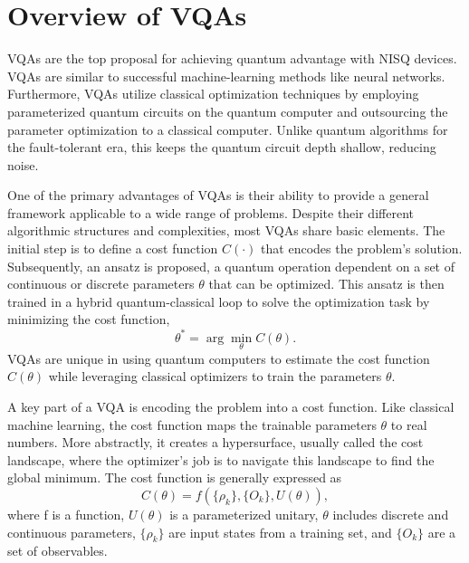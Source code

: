 \documentclass[12pt,dvipdfmx,twoside,openright]{report}
\begin{document}
\section{Overview of VQAs}
VQAs are the top proposal for achieving quantum advantage with NISQ devices. 
VQAs are similar to successful machine-learning methods like neural networks.
Furthermore, VQAs utilize classical optimization techniques by employing parameterized quantum circuits on the quantum computer and outsourcing the parameter optimization to a classical computer.
Unlike quantum algorithms for the fault-tolerant era, this keeps the quantum circuit depth shallow, reducing noise.

One of the primary advantages of VQAs is their ability to provide a general framework applicable to a wide range of problems.
Despite their different algorithmic structures and complexities, most VQAs share basic elements.
The initial step is to define a cost function $C(\cdot )$ that encodes the problem's solution. 
Subsequently, an ansatz is proposed, a quantum operation dependent on a set of continuous or discrete parameters $\theta$ that can be optimized. 
This ansatz is then trained in a hybrid quantum-classical loop to solve the optimization task by minimizing the cost function,
\begin{equation}
    \theta^* = \arg \min_\theta C(\theta).
\end{equation}
VQAs are unique in using quantum computers to estimate the cost function $C(\theta)$ while leveraging classical optimizers to train the parameters $\theta$.

A key part of a VQA is encoding the problem into a cost function. 
Like classical machine learning, the cost function maps the trainable parameters $\theta$ to real numbers. 
More abstractly, it creates a hypersurface, usually called the cost landscape, where the optimizer's job is to navigate this landscape to find the global minimum.
The cost function is generally expressed as
\begin{equation}
    C(\theta ) = f(\{\rho_k\},\{O_k\},U(\theta)),
\end{equation}
where f is a function, $U(\theta)$ is a parameterized unitary, $\theta$ includes discrete and continuous parameters, $\{\rho_k\}$ are input states from a training set, and $\{O_k\}$ are a set of observables.
\end{document}
